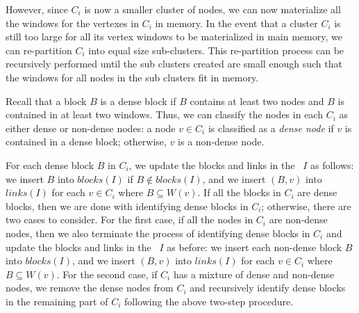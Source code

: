 However, since $C_i$ is now a smaller cluster of nodes, we can now materialize all the windows for the vertexes in $C_i$ in memory. In the event that a cluster $C_i$ is still too large for all its vertex windows to be materialized in main memory, we can re-partition $C_i$ into equal size sub-clusters. This re-partition process can be recursively performed until the sub clusters created are small enough such that the windows for all nodes in the sub clusters fit in memory. 

Recall that a block $B$ is a dense block if $B$ contains at least two nodes and
$B$ is contained in at least two windows.
Thus, we can classify the nodes in each $C_i$ as either dense or non-dense nodes:
a node $v \in C_i$ is classified as a {\it dense node} if $v$ is contained in a dense block;
otherwise, $v$ is a non-dense node.

For each dense block $B$ in $C_i$,
we update the blocks and links in the \DBIndex\ $I$ as follows:
we insert $B$ into $blocks(I)$ if $B \not\in blocks(I)$,
and we insert $(B,v)$ into $links(I)$
for each $v \in C_i$ where $B \subseteq W(v)$.
If all the blocks in $C_i$ are dense blocks, 
then we are done with identifying dense blocks in $C_i$;
otherwise, there are two cases to consider.
For the first case, if all the nodes in $C_i$ are non-dense nodes,
then we also terminate the process  of identifying dense blocks in $C_i$
and update the blocks and links in the \DBIndex\ $I$ as before:
we insert each non-dense block $B$ into $blocks(I)$,
and we insert $(B,v)$ into $links(I)$ for each $v \in C_i$ where $B \subseteq W(v)$.
For the second case, if $C_i$ has a mixture of dense and non-dense nodes,
we remove the dense nodes from $C_i$ and recursively identify dense blocks in the remaining part of $C_i$
following the above two-step procedure.

